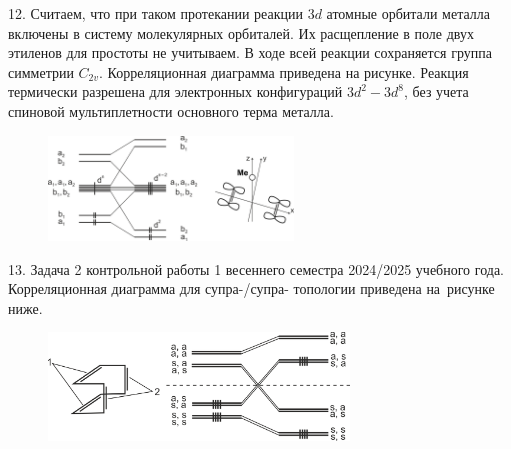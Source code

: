 12. Считаем, что при таком протекании реакции $3d$ атомные орбитали металла включены в систему молекулярных орбиталей. Их расщепление в поле двух этиленов для простоты не учитываем. В ходе всей реакции сохраняется группа симметрии $C_{2v}$. Корреляционная диаграмма приведена на рисунке. Реакция термически разрешена для электронных конфигураций $3d^2-3d^8$, без учета спиновой мультиплетности основного терма металла.\par
\vspace{-\parskip}
\vspace{1.5mm}
\begin{figure}[h]
\includegraphics[width=6.5cm]{images/Fig_2_1_12_dec.png}
\centering
\end{figure}
\par
13. Задача 2 контрольной работы 1 весеннего семестра 2024/2025 учебного года. Корреляционная диаграмма для супра-/супра- топологии приведена на~рисунке ниже.
\vspace{-\parskip}
\vspace{1.5mm}
\begin{figure}[h]
\includegraphics[width=8cm]{images/Fig_2_1_13_dec.png}
\centering
\end{figure}
\par
\vspace{-\parskip}
\newpage

